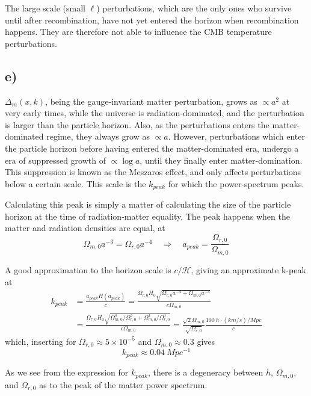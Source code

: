\documentclass[10pt, a4paper]{article}
\begin{document}
The large scale (small $\ell$) perturbations, which are the only ones who survive until after recombination, have not yet entered the horizon when recombination happens. They are therefore not able to influence the CMB temperature perturbations.



\subsection*{e)}
$\Delta_m(x,k)$, being the gauge-invariant matter perturbation, grows as $\propto a^2$ at very early times, while the universe is radiation-dominated, and the perturbation is larger than the particle horizon. Also, as the perturbations enters the matter-dominated regime, they always grow as $\propto a$. However, perturbations which enter the particle horizon before having entered the matter-dominated era, undergo a era of suppressed growth of $\propto \log{a}$, until they finally enter matter-domination. This suppression is known as the Meszaros effect, and only affects perturbations below a certain scale. This scale is the $k_{peak}$ for which the power-spectrum peaks.

Calculating this peak is simply a matter of calculating the size of the particle horizon at the time of radiation-matter equality. The peak happens when the matter and radiation densities are equal, at
\begin{equation}
    \Omega_{m,0}a^{-3} = \Omega_{r,0}a^{-4} \quad\Rightarrow\quad a_{peak} = \frac{\Omega_{r,0}}{\Omega_{m,0}}
\end{equation}


A good approximation to the horizon scale is $c/\mathcal{H}$, giving an approximate k-peak at
\begin{align}
    k_{peak} &= \frac{a_{peak}H(a_{peak})}{c} = \frac{\Omega_{r,0} H_0\sqrt{\Omega_{r,0}a^{-4} + \Omega_{m,0}a^{-3}}}{c\Omega_{m,0}}\\
    &= \frac{\Omega_{r,0}H_0\sqrt{\Omega_{m,0}^4/\Omega_{r,0}^3 + \Omega_{m,0}^4/\Omega_{r,0}^3}}{c\Omega_{m,0}} = \frac{\sqrt{2}\Omega_{m,0}}{\sqrt{\Omega_{r,0}}}\frac{\SI{100}{h\cdot (km/s)/Mpc}}{c}
\end{align}
which, inserting for $\Omega_{r,0} \approx 5\times 10^{-5}$ and $\Omega_{m,0} \approx 0.3$ gives
\begin{equation}
    k_{peak} \approx \SI{0.04}{Mpc^{-1}}
\end{equation}

As we see from the expression for $k_{peak}$, there is a degeneracy between $h$, $\Omega_{m,0}$, and $\Omega_{r,0}$ as to the peak of the matter power spectrum.
\end{document}
